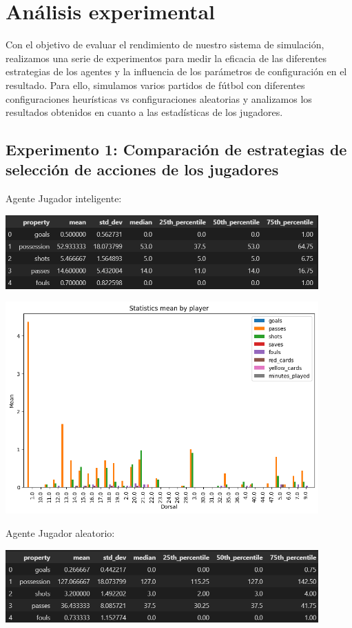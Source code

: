 \documentclass{article}
\begin{document}
\section{Análisis experimental}

Con el objetivo de evaluar el rendimiento de nuestro sistema de simulación, realizamos una serie de experimentos para medir
la eficacia de las diferentes estrategias de los agentes y la influencia de los parámetros de configuración en el resultado.
Para ello, simulamos varios partidos de fútbol con diferentes configuraciones heurísticas vs configuraciones 
aleatorias y analizamos los resultados obtenidos en cuanto a las estadísticas de los jugadores.

\subsection{Experimento 1: Comparación de estrategias de selección de acciones de los jugadores}
Agente Jugador inteligente:

\includegraphics[width=0.9\textwidth]{tabla1.PNG}

\includegraphics[width=0.9\textwidth,height=0.5\textwidth]{smart_vs_random_player_home.png}

Agente Jugador aleatorio:

\includegraphics[width=0.9\textwidth]{tabla2.PNG}
\end{document}
